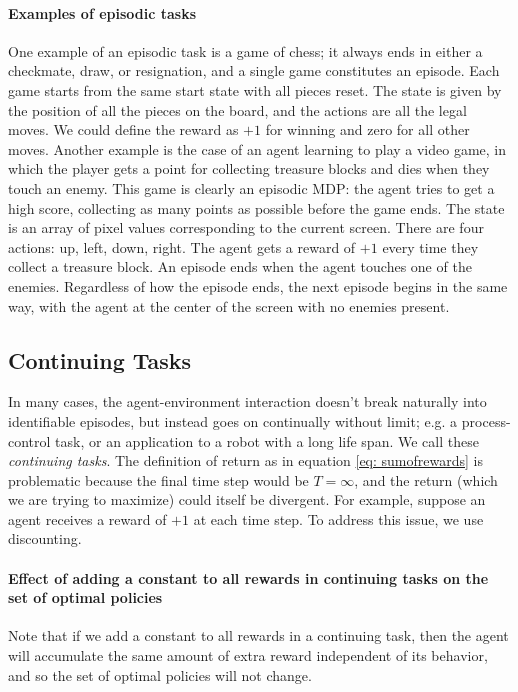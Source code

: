 \documentclass[12pt]{article}
\begin{document}
\paragraph{Examples of episodic tasks}
One example of an episodic task is a game of chess; it always ends in either a checkmate, draw, or resignation, and a single game constitutes an episode. Each game starts from the same start state with all pieces reset. The state is given by the position of all the pieces on the board, and the actions are all the legal moves. We could define the reward as $+1$ for winning and zero for all other moves. Another example is the case of an agent learning to play a video game, in which the player gets a point for collecting treasure blocks and dies when they touch an enemy. This game is clearly an episodic MDP: the agent tries to get a high score, collecting as many points as possible before the game ends. The state is an array of pixel values corresponding to the current screen. There are four actions: up, left, down, right. The agent gets a reward of $+1$ every time they collect a treasure block. An episode ends when the agent touches one of the enemies. Regardless of how the episode ends, the next episode begins in the same way, with the agent at the center of the screen with no enemies present.

\subsection{Continuing Tasks} In many cases, the agent-environment interaction doesn't break naturally into identifiable episodes, but instead goes on continually without limit; e.g. a process-control task, or an application to a robot with a long life span. We call these \emph{continuing tasks}. The definition of return as in equation \ref{eq: sumofrewards} is problematic because the final time step would be $T =\infty$, and the return (which we are trying to maximize) could itself be divergent. For example, suppose an agent receives a reward of $+1$ at each time step. To address this issue, we use discounting.

\paragraph{Effect of adding a constant to all rewards in continuing tasks on the set of optimal policies}
Note that if we add a constant to all rewards in a continuing task, then the agent will accumulate the same amount of extra reward independent of its behavior, and so the set of optimal policies will not change.
\end{document}
